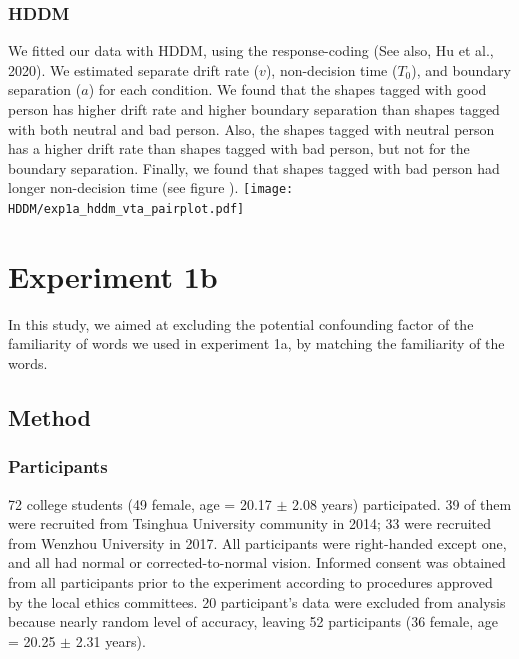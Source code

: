 \documentclass[
  english,
  man]{apa6}
\begin{document}
\hypertarget{hddm}{%
\subsubsection{HDDM}\label{hddm}}

We fitted our data with HDDM, using the response-coding (See also, Hu et al., 2020). We estimated separate drift rate (\(v\)), non-decision time (\(T_{0}\)), and boundary separation (\(a\)) for each condition. We found that the shapes tagged with good person has higher drift rate and higher boundary separation than shapes tagged with both neutral and bad person. Also, the shapes tagged with neutral person has a higher drift rate than shapes tagged with bad person, but not for the boundary separation. Finally, we found that shapes tagged with bad person had longer non-decision time (see figure ).
\texttt{[image: HDDM/exp1a\_hddm\_vta\_pairplot.pdf]}

\hypertarget{experiment-1b}{%
\section{Experiment 1b}\label{experiment-1b}}

In this study, we aimed at excluding the potential confounding factor of the familiarity of words we used in experiment 1a, by matching the familiarity of the words.

\hypertarget{method}{%
\subsection{Method}\label{method}}

\hypertarget{participants-1}{%
\subsubsection{Participants}\label{participants-1}}

72 college students (49 female, age = 20.17 \(\pm\) 2.08 years) participated. 39 of them were recruited from Tsinghua University community in 2014; 33 were recruited from Wenzhou University in 2017. All participants were right-handed except one, and all had normal or corrected-to-normal vision. Informed consent was obtained from all participants prior to the experiment according to procedures approved by the local ethics committees. 20 participant's data were excluded from analysis because nearly random level of accuracy, leaving 52 participants (36 female, age = 20.25 \(\pm\) 2.31 years).
\end{document}
